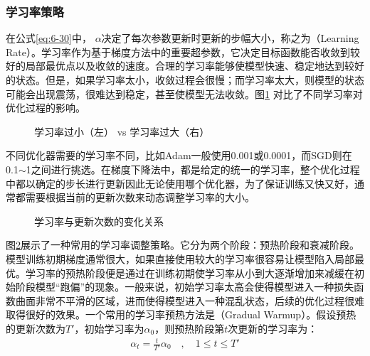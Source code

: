 
\subsubsection{学习率策略}
\vspace{0.5em}

\parinterval 在公式\ref{eq:6-30}中， $\alpha$决定了每次参数更新时更新的步幅大小，称之为{\small{}}（Learning Rate）。学习率作为基于梯度方法中的重要超参数，它决定目标函数能否收敛到较好的局部最优点以及收敛的速度。合理的学习率能够使模型快速、稳定地达到较好的状态。但是，如果学习率太小，收敛过程会很慢；而学习率太大，则模型的状态可能会出现震荡，很难达到稳定，甚至使模型无法收敛。图\ref{fig:6-28} 对比了不同学习率对优化过程的影响。

\begin{figure}[htp]
\centering

\caption{学习率过小（左） vs 学习率过大（右） }
\label{fig:6-28}
\end{figure}

\parinterval 不同优化器需要的学习率不同，比如Adam一般使用0.001或0.0001，而SGD则在0.1$\sim$1之间进行挑选。在梯度下降法中，都是给定的统一的学习率，整个优化过程中都以确定的步长进行更新因此无论使用哪个优化器，为了保证训练又快又好，通常都需要根据当前的更新次数来动态调整学习率的大小。
\vspace{0.5em}

\begin{figure}[htp]
\centering

\caption{学习率与更新次数的变化关系}
\label{fig:6-29}
\end{figure}

\parinterval 图\ref{fig:6-29}展示了一种常用的学习率调整策略。它分为两个阶段：预热阶段和衰减阶段。模型训练初期梯度通常很大，如果直接使用较大的学习率很容易让模型陷入局部最优。学习率的预热阶段便是通过在训练初期使学习率从小到大逐渐增加来减缓在初始阶段模型``跑偏''的现象。一般来说，初始学习率太高会使得模型进入一种损失函数曲面非常不平滑的区域，进而使得模型进入一种混乱状态，后续的优化过程很难取得很好的效果。一个常用的学习率预热方法是{\small{}}（Gradual Warmup）。假设预热的更新次数为$T'$，初始学习率为$\alpha_0$，则预热阶段第$t$次更新的学习率为：
\vspace{0.5em}
\begin{eqnarray}
\alpha_t = \frac{t}{T'} \alpha_0 \quad,\quad 1 \leq t \leq T'
\label{eq:6-34}
\end{eqnarray}

